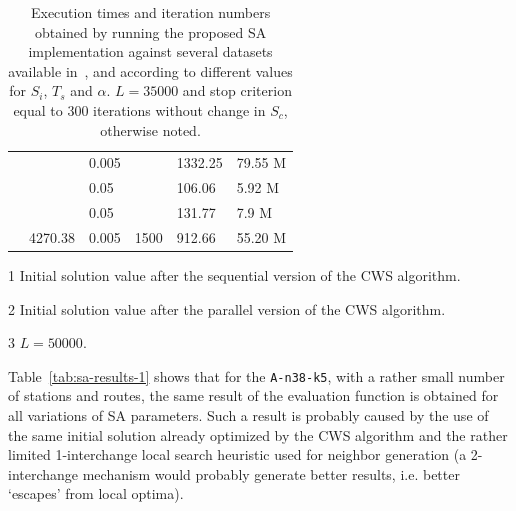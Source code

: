 \begin{table}[h!]
\begin{threeparttable}
\begin{tabularx}{0.45\textwidth}{ l l l l X X }
                                        &                           & 0.005 &                       & 1332.25\tnote{3}   & 79.55 M   \\ [0.5ex] %
                                        &                           & 0.05  &                       & 106.06    & 5.92 M    \\ [0.5ex]
                                        &                           & 0.05  &                       & 131.77\tnote{3}    & 7.9 M     \\ [0.5ex] %
            \cmidrule{2-6}
                                        & 4270.38                   & 0.005 & 1500\tnote{2}                  & 912.66    & 55.20 M   \\ [0.5ex]
            \bottomrule
        \end{tabularx}
        \begin{tablenotes}
            \footnotesize
            \item[1]Initial solution value after the sequential version of the CWS algorithm.
            \item[2]Initial solution value after the parallel version of the CWS algorithm.
            \item[3]$L = 50000$.
        \end{tablenotes}
    \caption{Execution times and iteration numbers obtained by running the 
            proposed SA implementation against 
            several datasets available in~\cite{website:cvrp-datasets}, and 
            according to different values for $S_i$, $T_s$ and $\alpha$. 
            $L = 35000$ and stop criterion equal to 300 iterations without 
            change in $S_c$, otherwise noted.}
    \label{tab:sa-results-2}
    \end{threeparttable}
\end{table}

Table~\ref{tab:sa-results-1} shows that for the \verb?A-n38-k5?, with a rather 
small number of stations and routes, the same result of the evaluation function 
is obtained for all variations of SA parameters. Such a result is probably 
caused by the use of the same initial solution already optimized by the CWS 
algorithm and the rather limited 1-interchange local search heuristic used for 
neighbor generation (a 2-interchange mechanism would probably generate better 
results, i.e. better `escapes' from local optima).\vertbreak

